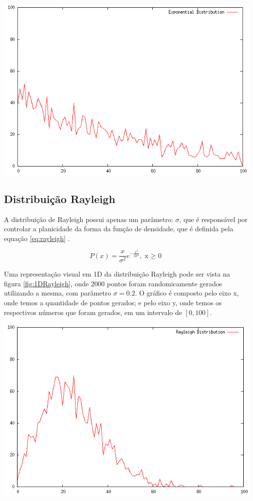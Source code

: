 {
    \centering
    \includegraphics[width=0.6\linewidth]{figuras/DistribuicaoExponencial.png}
    \label{fig:1DExponencial}
}

\subsection{Distribuição Rayleigh}

A distribuição de Rayleigh possui apenas um parâmetro: $\sigma$, que é responsável por controlar a planicidade da forma da função de densidade, que é definida pela equação \ref{eq:rayleigh} \cite{yu}.

\begin{equation}
\label{eq:rayleigh}
P(x) = \frac{x}{\sigma^{2}}e^{-\frac{x^{2}}{2\sigma^{2}}}, \text{x $\geq$ 0}
\end{equation}

Uma representação visual em 1D da distribuição Rayleigh pode ser vista na figura \ref{fig:1DRayleigh}, onde 2000 pontos foram randomicamente gerados utilizando a mesma, com parâmetro $\sigma = 0.2$. O gráfico é composto pelo eixo x, onde temos a quantidade de pontos gerados; e pelo eixo y, onde temos os respectivos números que foram gerados, em um intervalo de $[0, 100]$.

{
    \centering
    \includegraphics[width=0.6\linewidth]{figuras/DistribuicaoRayleigh.png}
    \label{fig:1DRayleigh}
}

